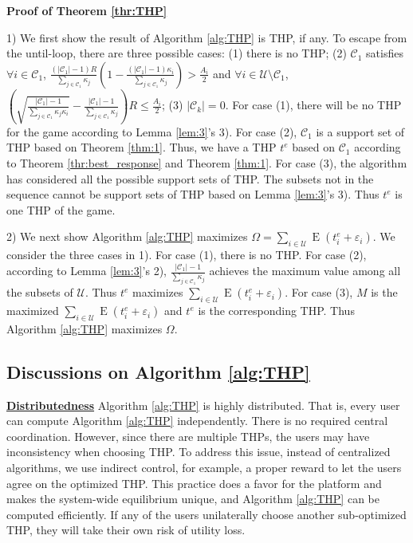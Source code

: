 \documentclass{IEEEtran}
\begin{document}
\noindent \textbf{Proof of Theorem \ref{thr:THP}}
\begin{IEEEproof}
1) We first show the result of Algorithm \ref{alg:THP} is THP, if any. To escape from the until-loop, there are three possible cases: (1) there is no THP; (2) $\mathcal{C}_1$ satisfies $\forall i\in\mathcal{C}_1$, $\frac{(|\mathcal{C}_1|-1)R}{\sum_{j\in\mathcal{C}_1}\kappa_j}(1-\frac{(|\mathcal{C}_1|-1)\kappa_i}{\sum_{j\in\mathcal{C}_1}\kappa_j})>\frac{A_i}{2}$ and $\forall i\in\mathcal{U}\setminus\mathcal{C}_1$, $(\sqrt{\frac{|\mathcal{C}_1|-1}{\sum_{j\in\mathcal{C}_1}\kappa_j\kappa_i}}-\frac{|\mathcal{C}_1|-1}{\sum_{j\in\mathcal{C}_1}\kappa_j})R\leq\frac{A_i}{2}$; (3) $|\mathcal{C}_k|=0$. For case (1), there will be no THP for the game according to Lemma \ref{lem:3}'s 3). For case (2), $\mathcal{C}_1$ is a support set of THP based on Theorem \ref{thm:1}. Thus, we have a THP $t^{e}$ based on $\mathcal{C}_1$ according to Theorem \ref{thr:best_response} and Theorem \ref{thm:1}. For case (3), the algorithm has considered all the possible support sets of THP. The subsets not in the sequence cannot be support sets of THP based on Lemma \ref{lem:3}'s 3). Thus $t^{e}$ is one THP of the game.

2) We next show Algorithm \ref{alg:THP} maximizes $\Omega=\sum_{i\in\mathcal{U}}\operatorname{E}(t_i^{e}+\varepsilon_i)$. We consider the three cases in 1). For case (1), there is no THP. For case (2), according to Lemma \ref{lem:3}'s 2), $\frac{|\mathcal{C}_1|-1}{\sum_{j\in\mathcal{C}_1}\kappa_j}$ achieves the maximum value among all the subsets of $\mathcal{U}$. Thus $t^{e}$ maximizes $\sum_{i\in\mathcal{U}}\operatorname{E}(t_i^{e}+\varepsilon_i)$. For case (3), $M$ is the maximized $\sum_{i\in\mathcal{U}}\operatorname{E}(t_i^{e}+\varepsilon_i)$ and $t^{e}$ is the corresponding THP. Thus Algorithm \ref{alg:THP} maximizes $\Omega$.
\end{IEEEproof}

\subsection{Discussions on Algorithm \ref{alg:THP}}
\label{sec:alg_discuss}
{\color{black}
\noindent \textbf{\underline{Distributedness}} Algorithm \ref{alg:THP} is highly distributed. That is, every user can compute Algorithm \ref{alg:THP} independently. There is no required central coordination. However, since there are multiple THPs, the users may have inconsistency when choosing THP. To address this issue, instead of centralized algorithms, we use indirect control, for example, a proper reward to let the users agree on the optimized THP. This practice does a favor for the platform and makes the system-wide equilibrium unique, and Algorithm \ref{alg:THP} can be computed efficiently. If any of the users unilaterally choose another sub-optimized THP, they will take their own risk of utility loss.
}
\end{document}
